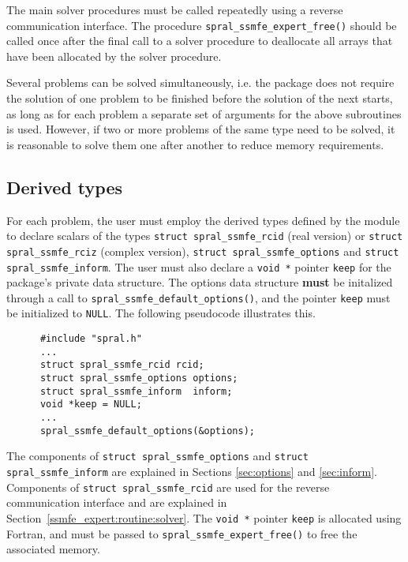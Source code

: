 The main solver procedures
must be called repeatedly using
a reverse communication interface.
The procedure \texttt{spral\_ssmfe\_expert\_free()}
should be called once after the
final call to 
a solver procedure
to deallocate all arrays 
that have been allocated by
the solver procedure.

Several problems can be solved simultaneously,
i.e. the package does not require the solution of
one problem to be finished before the solution of
the next starts, as long as for each problem a separate set
of arguments for the above subroutines is used.
However, if two or more problems of the same type
need to be solved, it is reasonable to solve them one
after another  to reduce  memory requirements.
\fi

\subsection{Derived types}
\label{derived types}

For each problem, the user must employ the derived types defined by the
module to declare scalars of the types 
{\tt struct spral\_ssmfe\_rcid} (real version) or 
{\tt struct spral\_ssmfe\_rciz} (complex version), 
{\tt struct spral\_ssmfe\_options} and 
{\tt struct spral\_ssmfe\_inform}. The user must also declare a \texttt{void *}
pointer \texttt{keep} for the package's private data structure. The options
data structure \textbf{must} be initalized through a call to \texttt{spral\_ssmfe\_default\_options()},
and the pointer \texttt{keep} must be initialized to \texttt{NULL}.
The following pseudocode illustrates this.
\begin{verbatim}
      #include "spral.h"
      ...
      struct spral_ssmfe_rcid rcid;
      struct spral_ssmfe_options options;
      struct spral_ssmfe_inform  inform;
      void *keep = NULL;
      ...
      spral_ssmfe_default_options(&options);
\end{verbatim}
The components of {\tt struct spral\_ssmfe\_options} and {\tt struct spral\_ssmfe\_inform} are explained
in Sections \ref{sec:options} and \ref{sec:inform}. Components
of \texttt{struct spral\_ssmfe\_rcid} are used for the reverse communication interface and
are explained in Section~\ref{ssmfe_expert:routine:solver}.
The \texttt{void~*} pointer \texttt{keep} is allocated using Fortran, and
must be passed to \texttt{spral\_ssmfe\_expert\_free()} to free the associated
memory.


